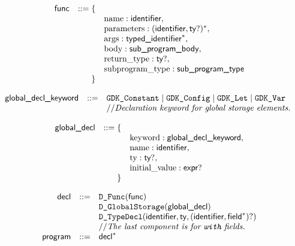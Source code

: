 \documentclass{book}
\begin{document}
\[
\begin{array}{rrl}
\textsf{func} &::= \{& \\
 & & \text{name} : \textsf{identifier}, \\
 & & \text{parameters} : (\textsf{identifier}, \textsf{ty}?)^*,\\
 & & \text{args} : \textsf{typed\_identifier}^*,\\
 & & \text{body} : \textsf{sub\_program\_body},\\
 & & \text{return\_type} : \textsf{ty}?,\\
 & & \text{subprogram\_type} : \textsf{sub\_program\_type}\\
 & \} &
\end{array}
\]

\[
\begin{array}{rcl}
\textsf{global\_decl\_keyword} &::=& \texttt{GDK\_Constant} \;|\; \texttt{GDK\_Config} \;|\; \texttt{GDK\_Let} \;|\; \texttt{GDK\_Var}\\
  & & // \textit{Declaration keyword for global storage elements.}\ \\
\end{array}
\]

\[
\begin{array}{rrl}
\textsf{global\_decl} &::= \{& \\
 & & \text{keyword} : \textsf{global\_decl\_keyword}, \\
 & & \text{name} : \textsf{identifier},\\
 & & \text{ty} : \textsf{ty}?,\\
 & & \text{initial\_value} : \textsf{expr}?\\
 & \} &
\end{array}
\]

\[
\begin{array}{rcl}
\textsf{decl} &::=& \texttt{D\_Func}(\textsf{func})\\
  & & \texttt{D\_GlobalStorage}(\textsf{global\_decl})\\
  & & \texttt{D\_TypeDecl}(\textsf{identifier}, \textsf{ty}, (\textsf{identifier}, \textsf{field}^*)?)\\
  & & // \textit{The last component is for \texttt{with} fields.}\ \\
\textsf{program} &::=& \textsf{decl}^*\\
\end{array}
\]

\end{document}
